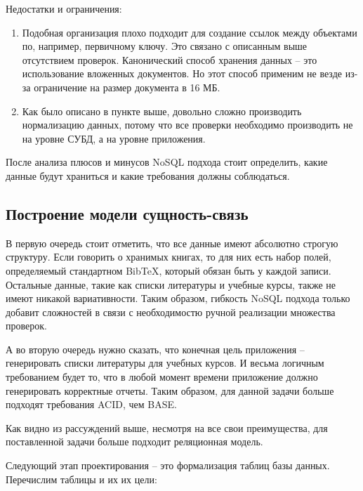 Недостатки и ограничения:

\begin{enumerate}
	\item Подобная организация плохо подходит для создание ссылок между объектами по, например,
	      первичному ключу. Это связано с описанным выше отсутствием проверок. Канонический
	      способ хранения данных -- это использование вложенных документов. Но этот способ
	      применим не везде из-за ограничение на размер документа в 16 МБ.
	\item Как было описано в пункте выше, довольно сложно производить нормализацию
	      данных, потому что все проверки необходимо производить не на уровне СУБД, а
	      на уровне приложения.
\end{enumerate}

После анализа плюсов и минусов NoSQL подхода стоит определить, какие данные будут храниться
и какие требования должны соблюдаться.

\subsection*{Построение модели сущность-связь}

В первую очередь стоит отметить, что все данные имеют абсолютно строгую структуру. Если говорить
о хранимых книгах, то для них есть набор полей, определяемый стандартном BibTeX, который обязан
быть у каждой записи. Остальные данные, такие как списки литературы и учебные курсы, также не имеют
никакой вариативности. Таким образом, гибкость NoSQL подхода только добавит сложностей в связи
с необходимостю ручной реализации множества проверок.

А во вторую очередь нужно сказать, что конечная цель приложения -- генерировать списки литературы
для учебных курсов. И весьма логичным требованием будет то, что в любой момент времени приложение
должно генерировать корректные отчеты. Таким образом, для данной задачи больше подходят требования
ACID, чем BASE.

Как видно из рассуждений выше, несмотря на все свои преимущества, для поставленной задачи больше
подходит реляционная модель.

Следующий этап проектирования -- это формализация таблиц базы данных. Перечислим таблицы и их
их цели:

